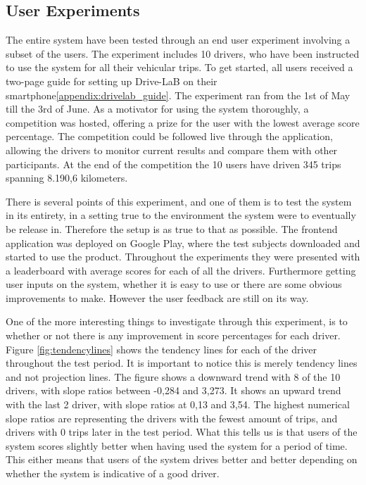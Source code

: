 \subsection{User Experiments}\label{subsec:userexp}

The entire system have been tested through an end user experiment involving a subset of the users. The experiment includes 10 drivers, who have been instructed to use the system for all their vehicular trips. To get started, all users received a two-page guide for setting up Drive-LaB on their smartphone\ref{appendix:drivelab_guide}. The experiment ran from the 1st of May till the 3rd of June. As a motivator for using the system thoroughly, a competition was hosted, offering a prize for the user with the lowest average score percentage. The competition could be followed live through the application, allowing the drivers to monitor current results and compare them with other participants. At the end of the competition the 10 users have driven 345 trips spanning 8.190,6 kilometers.

There is several points of this experiment, and one of them is to test the system in its entirety, in a setting true to the environment the system were to eventually be release in. Therefore the setup is as true to that as possible. The frontend application was deployed on Google Play, where the test subjects downloaded and started to use the product. Throughout the experiments they were presented with a leaderboard with average scores for each of all the drivers. 
Furthermore getting user inputs on the system, whether it is easy to use or there are some obvious improvements to make. However the user feedback are still on its way.

One of the more interesting things to investigate through this experiment, is to whether or not there is any improvement in score percentages for each driver. Figure \ref{fig:tendencylines} shows the tendency lines for each of the driver throughout the test period. It is important to notice this is merely tendency lines and not projection lines. The figure shows a downward trend with 8 of the 10 drivers, with  slope ratios between -0,284 and 3,273. It shows an upward trend with the last 2 driver, with slope ratios at 0,13 and 3,54. The highest numerical slope ratios are representing the drivers with the fewest amount of trips, and drivers with 0 trips later in the test period. What this tells us is that users of the system scores slightly better when having used the system for a period of time. This either means that users of the system drives better and better depending on whether the system is indicative of a good driver.


